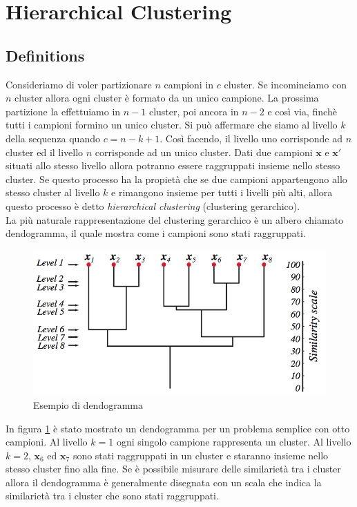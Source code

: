 \section{Hierarchical Clustering}


\subsection{Definitions}
Consideriamo di voler partizionare $n$ campioni in $c$ cluster. Se incominciamo con $n$ cluster allora ogni cluster è formato da un unico campione. La prossima partizione la effettuiamo in $n-1$ cluster, poi ancora in $n-2$ e così via, finchè tutti i campioni formino un unico cluster. Si può affermare che siamo al livello $k$ della sequenza quando $c = n-k+1$.  Così facendo, il livello uno corrisponde ad $n$ cluster ed il livello $n$ corrisponde ad un unico cluster. Dati due campioni $\mathbf{x}$ e $\mathbf{x}'$ situati allo stesso livello allora potranno essere raggruppati insieme nello stesso cluster. Se questo processo ha la propietà che se due campioni appartengono allo stesso cluster al livello $k$ e rimangono insieme per tutti i livelli più alti, allora questo processo è detto \emph{hierarchical clustering} (clustering gerarchico).\\

\noindent La più naturale rappresentazione del clustering gerarchico è un albero chiamato dendogramma, il quale mostra come i campioni sono stati raggruppati. 
\begin{figure}
\centering
\includegraphics[scale=0.5]{img/dendogramma.png}
\caption{Esempio di dendogramma}
\label{dendogramma}
\end{figure}
In figura \ref{dendogramma} è stato mostrato un dendogramma per un problema semplice con otto campioni. Al livello $k=1$ ogni singolo campione rappresenta un cluster. Al livello $k=2$, $\mathbf{x}_6$ ed $\mathbf{x}_7$ sono stati raggruppati in un cluster e staranno insieme nello stesso cluster fino alla fine. Se è possibile misurare delle similarietà tra i cluster allora il dendogramma è generalmente disegnata con un scala che indica la similarietà tra i cluster che sono stati raggruppati.\\

